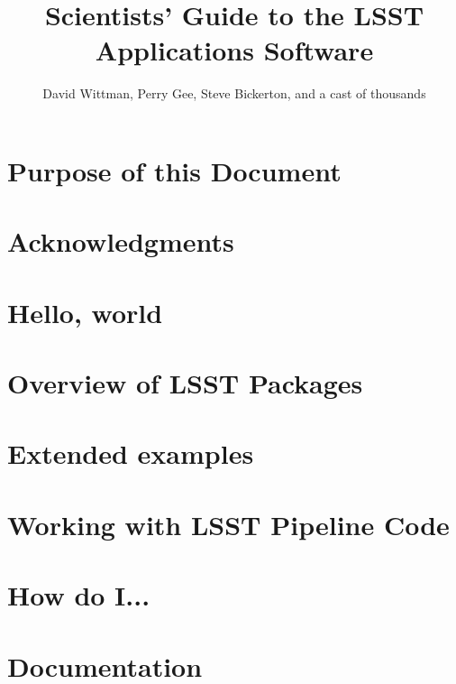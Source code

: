 \documentclass[oneside]{book}
\title{Scientists' Guide to the LSST Applications Software}
\author{David Wittman, Perry Gee, Steve Bickerton, and a cast of thousands}
\begin{document}
\maketitle

\chapter*{Purpose of this Document\label{chap-purpose}}


\chapter*{Acknowledgments\label{chap-acknowledgements}}


\tableofcontents

\chapter{Hello, world\label{chap-hello}}


\chapter{Overview of LSST Packages\label{chap-overview}}



\chapter{Extended examples\label{chap-examples}}


\chapter{Working with LSST Pipeline Code\label{lsst-pipelines}}


\chapter{How do I...\label{chap-howto}}


\chapter{Documentation\label{chap-doc}}


%
% 



\appendix
\end{document}
